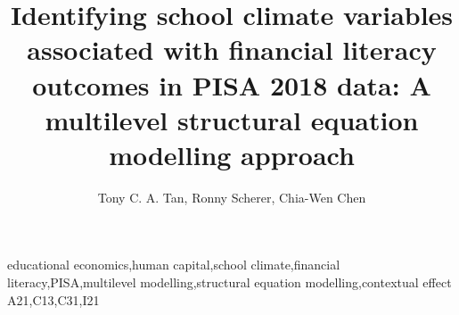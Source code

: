 \documentclass[review]{elsarticle}
\begin{document}
\begin{frontmatter}

\title{Identifying school climate variables associated with financial literacy outcomes in PISA 2018 data: A multilevel structural equation modelling approach}

\author{Tony C. A. Tan, Ronny Scherer, Chia-Wen Chen}
\address{Centre for Educational Measurement, University of Oslo}






\begin{keyword}
educational economics\sep human capital\sep school climate\sep financial literacy\sep PISA\sep multilevel modelling\sep structural equation modelling\sep contextual effect
\JEL A21\sep  C13\sep C31\sep I21
\end{keyword}

\end{frontmatter}

\linenumbers












\end{document}
